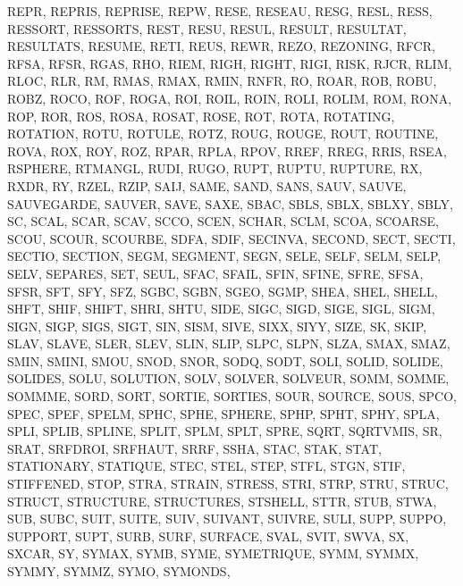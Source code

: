 {{{		REPR,
		REPRIS,
		REPRISE,
		REPW,
		RESE,
		RESEAU,
		RESG,
		RESL,
		RESS,
		RESSORT,
		RESSORTS,
		REST,
		RESU,
		RESUL,
		RESULT,
		RESULTAT,
		RESULTATS,
		RESUME,
		RETI,
		REUS,
		REWR,
		REZO,
		REZONING,
		RFCR,
		RFSA,
		RFSR,
		RGAS,
		RHO,
		RIEM,
		RIGH,
		RIGHT,
		RIGI,
		RISK,
		RJCR,
		RLIM,
		RLOC,
		RLR,
		RM,
		RMAS,
		RMAX,
		RMIN,
		RNFR,
		RO,
		ROAR,
		ROB,
		ROBU,
		ROBZ,
		ROCO,
		ROF,
		ROGA,
		ROI,
		ROIL,
		ROIN,
		ROLI,
		ROLIM,
		ROM,
		RONA,
		ROP,
		ROR,
		ROS,
		ROSA,
		ROSAT,
		ROSE,
		ROT,
		ROTA,
		ROTATING,
		ROTATION,
		ROTU,
		ROTULE,
		ROTZ,
		ROUG,
		ROUGE,
		ROUT,
		ROUTINE,
		ROVA,
		ROX,
		ROY,
		ROZ,
		RPAR,
		RPLA,
		RPOV,
		RREF,
		RREG,
		RRIS,
		RSEA,
		RSPHERE,
		RTMANGL,
		RUDI,
		RUGO,
		RUPT,
		RUPTU,
		RUPTURE,
		RX,
		RXDR,
		RY,
		RZEL,
		RZIP,
		SAIJ,
		SAME,
		SAND,
		SANS,
		SAUV,
		SAUVE,
		SAUVEGARDE,
		SAUVER,
		SAVE,
		SAXE,
		SBAC,
		SBLS,
		SBLX,
		SBLXY,
		SBLY,
		SC,
		SCAL,
		SCAR,
		SCAV,
		SCCO,
		SCEN,
		SCHAR,
		SCLM,
		SCOA,
		SCOARSE,
		SCOU,
		SCOUR,
		SCOURBE,
		SDFA,
		SDIF,
		SECINVA,
		SECOND,
		SECT,
		SECTI,
		SECTIO,
		SECTION,
		SEGM,
		SEGMENT,
		SEGN,
		SELE,
		SELF,
		SELM,
		SELP,
		SELV,
		SEPARES,
		SET,
		SEUL,
		SFAC,
		SFAIL,
		SFIN,
		SFINE,
		SFRE,
		SFSA,
		SFSR,
		SFT,
		SFY,
		SFZ,
		SGBC,
		SGBN,
		SGEO,
		SGMP,
		SHEA,
		SHEL,
		SHELL,
		SHFT,
		SHIF,
		SHIFT,
		SHRI,
		SHTU,
		SIDE,
		SIGC,
		SIGD,
		SIGE,
		SIGL,
		SIGM,
		SIGN,
		SIGP,
		SIGS,
		SIGT,
		SIN,
		SISM,
		SIVE,
		SIXX,
		SIYY,
		SIZE,
		SK,
		SKIP,
		SLAV,
		SLAVE,
		SLER,
		SLEV,
		SLIN,
		SLIP,
		SLPC,
		SLPN,
		SLZA,
		SMAX,
		SMAZ,
		SMIN,
		SMINI,
		SMOU,
		SNOD,
		SNOR,
		SODQ,
		SODT,
		SOLI,
		SOLID,
		SOLIDE,
		SOLIDES,
		SOLU,
		SOLUTION,
		SOLV,
		SOLVER,
		SOLVEUR,
		SOMM,
		SOMME,
		SOMMME,
		SORD,
		SORT,
		SORTIE,
		SORTIES,
		SOUR,
		SOURCE,
		SOUS,
		SPCO,
		SPEC,
		SPEF,
		SPELM,
		SPHC,
		SPHE,
		SPHERE,
		SPHP,
		SPHT,
		SPHY,
		SPLA,
		SPLI,
		SPLIB,
		SPLINE,
		SPLIT,
		SPLM,
		SPLT,
		SPRE,
		SQRT,
		SQRTVMIS,
		SR,
		SRAT,
		SRFDROI,
		SRFHAUT,
		SRRF,
		SSHA,
		STAC,
		STAK,
		STAT,
		STATIONARY,
		STATIQUE,
		STEC,
		STEL,
		STEP,
		STFL,
		STGN,
		STIF,
		STIFFENED,
		STOP,
		STRA,
		STRAIN,
		STRESS,
		STRI,
		STRP,
		STRU,
		STRUC,
		STRUCT,
		STRUCTURE,
		STRUCTURES,
		STSHELL,
		STTR,
		STUB,
		STWA,
		SUB,
		SUBC,
		SUIT,
		SUITE,
		SUIV,
		SUIVANT,
		SUIVRE,
		SULI,
		SUPP,
		SUPPO,
		SUPPORT,
		SUPT,
		SURB,
		SURF,
		SURFACE,
		SVAL,
		SVIT,
		SWVA,
		SX,
		SXCAR,
		SY,
		SYMAX,
		SYMB,
		SYME,
		SYMETRIQUE,
		SYMM,
		SYMMX,
		SYMMY,
		SYMMZ,
		SYMO,
		SYMONDS,
}}}
